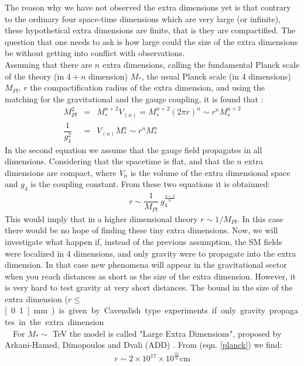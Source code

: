 The reason why we have not observed the extra dimensions yet is that contrary to the ordinary four space-time dimensions which are very large (or infinite), these hypothetical extra dimensions are finite, that is they are compactified. The  question that one needs to ask is how large could the size of the extra dimensions be without getting into conflict with observations.\\
\indent 
Assuming that there are $n$ extra dimensions, calling the fundamental Planck scale of the theory (in $4+n$ dimension) $M_{*}$, the usual Planck scale (in 4 dimensions) $M_{Pl}$, $r$ the compactification radius of the extra dimension, and using the matching for the gravitational and the gauge coupling, it is found that \cite{Csaki:2004ay}:
\begin{eqnarray}
M_{Pl}^{2} &=& M_{*}^{n+2}V_{(n)}= M_{*}^{n+2}\left(2 \pi r \right)^{n} \sim r^{n}M_{*}^{n+2}\label{planck}\\ 
\dfrac{1}{g_{4}^{2}} &=& V_{(n)}M_{*}^{n} \sim r^{n}M_{*}^{n}
\end{eqnarray}
In the second equation we assume that the gauge field propagates in all dimensions. Considering that the spacetime is flat, and that the $n$ extra dimensions are compact, where $V_{n}$ is the volume of the extra dimensional space and $g_{4}$ is the coupling constant. From these two equations it is obtainned:
\begin{eqnarray}
r \sim \dfrac{1}{M_{Pl}}\:g_{4}^{\frac{n+2}{n}}
\end{eqnarray}
This would imply that in a higher dimensional theory $r \sim 1/M_{Pl}$. In this case there would be no hope of finding these tiny extra dimensions. Now, we will investigate what happen if, instead of the previous assumption, the SM fields were localized in 4 dimensions, and only gravity were to propagate into the extra dimension. 
In that case new phenomena will appear in the gravitational sector when you reach distances as short as the size of the extra dimension. However, it is very hard to test gravity at very short distances. The bound in the size of the extra dimension ($r\leq$ \unit[0.1]{mm}) is given by Cavendish type experiments if only gravity propagates in the extra dimension.\\ 
\indent
For $M_{*}\sim$ \unit[1]{TeV} the model is called "Large Extra Dimensions", proposed by Arkani-Hamed, Dimopoulos and Dvali (ADD) \cite{ArkaniHamed:1998rs}.
From (eqn. \ref{planck}) we find:
\begin{eqnarray}
r \sim 2\times 10^{17}\times 10^{\frac{32}{n}} \text{cm}
\end{eqnarray}
